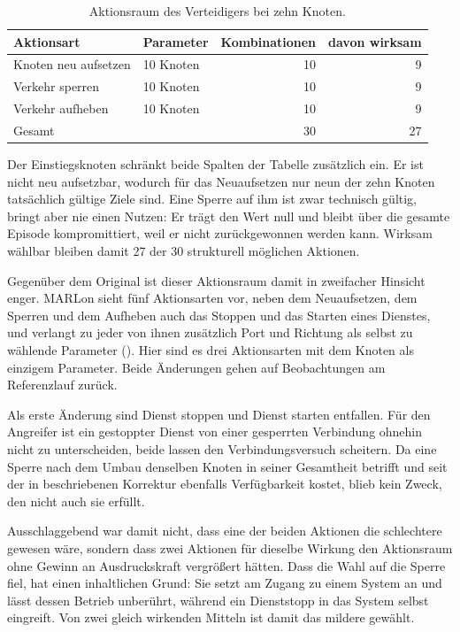 \begin{table}[H]
  \centering
  \caption[Aktionsraum des Verteidigers]{Aktionsraum des Verteidigers bei zehn
  Knoten.}
  \label{tab:aktionsraum-def}
  \begin{tabular}{llrr}
    \toprule
    Aktionsart & Parameter & Kombinationen & davon wirksam \\
    \midrule
    Knoten neu aufsetzen & 10 Knoten & 10 & 9 \\
    Verkehr sperren      & 10 Knoten & 10 & 9 \\
    Verkehr aufheben     & 10 Knoten & 10 & 9 \\
    \midrule
    Gesamt                &  & 30 & 27 \\
    \bottomrule
  \end{tabular}
\end{table}

Der Einstiegsknoten schränkt beide Spalten der Tabelle zusätzlich ein. Er ist
nicht neu aufsetzbar, wodurch für das Neuaufsetzen nur neun der zehn Knoten
tatsächlich gültige Ziele sind. Eine Sperre auf ihm ist zwar technisch gültig,
bringt aber nie einen Nutzen: Er trägt den Wert null und bleibt über die
gesamte Episode kompromittiert, weil er nicht zurückgewonnen werden kann.
Wirksam wählbar bleiben damit 27 der 30 strukturell möglichen Aktionen.

Gegenüber dem Original ist dieser Aktionsraum damit in zweifacher Hinsicht
enger. MARLon sieht fünf Aktionsarten vor, neben dem Neuaufsetzen, dem Sperren
und dem Aufheben auch das Stoppen und das Starten eines Dienstes, und verlangt
zu jeder von ihnen zusätzlich Port und Richtung als selbst zu wählende
Parameter (). Hier sind es drei Aktionsarten mit dem
Knoten als einzigem Parameter. Beide Änderungen gehen auf Beobachtungen am
Referenzlauf zurück.

Als erste Änderung sind Dienst stoppen und Dienst starten entfallen. Für den Angreifer ist
ein gestoppter Dienst von einer gesperrten Verbindung ohnehin nicht zu
unterscheiden, beide lassen den Verbindungsversuch scheitern. Da eine Sperre
nach dem Umbau denselben Knoten in seiner Gesamtheit betrifft und seit der in
 beschriebenen Korrektur ebenfalls Verfügbarkeit kostet, blieb
kein Zweck, den nicht auch sie erfüllt.

Ausschlaggebend war damit nicht, dass eine der beiden Aktionen die schlechtere
gewesen wäre, sondern dass zwei Aktionen für dieselbe Wirkung den Aktionsraum
ohne Gewinn an Ausdruckskraft vergrößert hätten. Dass die Wahl auf die Sperre
fiel, hat einen inhaltlichen Grund: Sie setzt am Zugang zu einem System an und
lässt dessen Betrieb unberührt, während ein Dienststopp in das System selbst
eingreift. Von zwei gleich wirkenden Mitteln ist damit das mildere gewählt.

